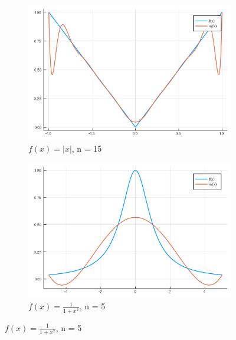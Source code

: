 \documentclass{article}
\begin{document}
\begin{figure}[ht]
	\begin{subfigure}{.5\textwidth}
		\centering
		\includegraphics[width=.8\linewidth]{plots/6_3.png}  
		\caption*{$f(x) = |x|$, n = 15}
	\end{subfigure}
	\begin{subfigure}{.5\textwidth}
		\centering
		\includegraphics[width=.8\linewidth]{plots/6_4.png}  
		\caption*{$f(x) = \frac{1}{1+x^2}$, n = 5}
	\end{subfigure}
\end{figure}
\end{document}
